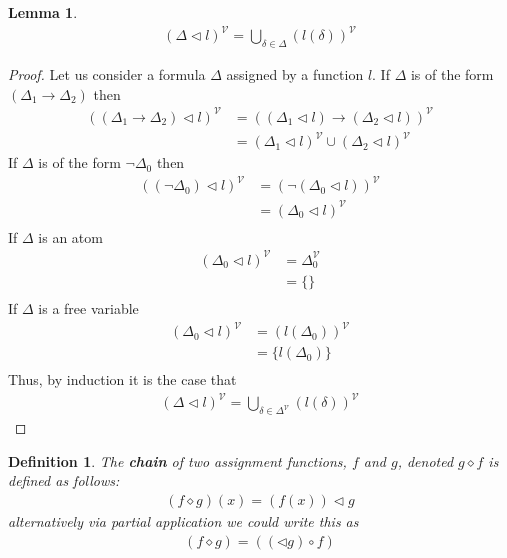 \documentclass{article}
\newtheorem{lem}{Lemma}
\newtheorem{defin}{Definition}
\begin{document}
\begin{lem}
\begin{align*}
(\Delta\lhd l)^\mathcal{V}
= \bigcup_{\delta \in \Delta} (l(\delta))^\mathcal{V}
\end{align*}
\end{lem}
\begin{proof}
Let us consider a formula $\Delta$ assigned by a function $l$.
If $\Delta$ is of the form $(\Delta_1\rightarrow\Delta_2)$ then
\begin{align*}
((\Delta_1\rightarrow\Delta_2)\lhd l)^\mathcal{V}
&= ((\Delta_1\lhd l)\rightarrow(\Delta_2\lhd l))^\mathcal{V} \tag{Definition of Assignment} \\
&= (\Delta_1\lhd l)^\mathcal{V}\cup(\Delta_2\lhd l)^\mathcal{V} \tag{Definition of Free Variable Set}
\end{align*}
If $\Delta$ is of the form $\neg \Delta_0$ then
\begin{align*}
((\neg \Delta_0)\lhd l)^\mathcal{V}
&= (\neg (\Delta_0\lhd l))^\mathcal{V} \tag{Definition of Assignment} \\
&= (\Delta_0\lhd l)^\mathcal{V} \tag{Definition of Free Variable Set} \\
\end{align*}
If $\Delta$ is an atom
\begin{align*}
(\Delta_0\lhd l)^\mathcal{V}
&= \Delta_0^\mathcal{V} \tag{Definition of Assignment} \\
&= \{\} \tag{Definition of Free Variable Set} \\
\end{align*}
If $\Delta$ is a free variable
\begin{align*}
(\Delta_0\lhd l)^\mathcal{V}
&= (l(\Delta_0))^\mathcal{V} \tag{Definition of Assignment} \\
&= \{l(\Delta_0)\} \tag{Definition of Free Variable Set} \\
\end{align*}
Thus, by induction it is the case that 
\begin{align*}
(\Delta\lhd l)^\mathcal{V}
= \bigcup_{\delta \in \Delta^\mathcal{V}} (l(\delta))^\mathcal{V}
\end{align*}
\end{proof}

\begin{defin}
The \textbf{chain} of two assignment functions, $f$ and $g$, denoted $g \diamond f$ is defined as follows:
\begin{align*}
(f \diamond g) (x) = (f (x)) \lhd g
\end{align*}
alternatively via partial application we could write this as
\begin{align*}
(f \diamond g) = ((\lhd g)\circ f)
\end{align*}
\end{defin}
\end{document}
